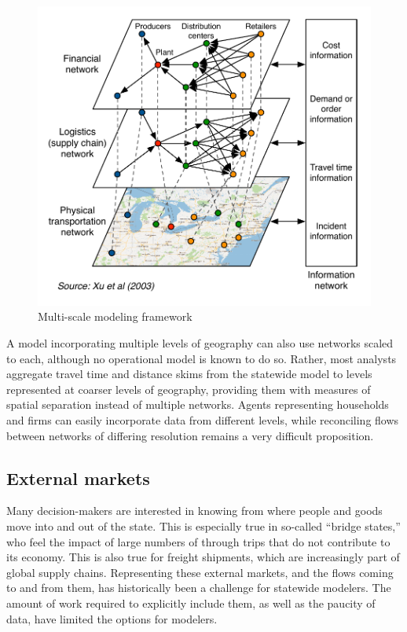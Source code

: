 \begin{figure}  %
\centering
\includegraphics[scale=0.6]{graphics/43-multi-scale-modeling}
\caption{Multi-scale modeling framework}
\label{fig:multi-scale-modeling}
\end{figure}

A model incorporating multiple levels of geography can also use networks scaled to each, although no operational model is known to do so. Rather, most analysts aggregate travel time and distance skims from the statewide model to levels represented at coarser levels of geography, providing them with measures of spatial separation instead of multiple networks. Agents representing households and firms can easily incorporate data from different levels, while reconciling flows between networks of differing resolution remains a very difficult proposition.

\subsection{External markets}

Many decision-makers are interested in knowing from where people and goods move into and out of the state. This is especially true in so-called ``bridge states,'' who feel the impact of large numbers of through trips that do not contribute to its economy. This is also true for freight shipments, which are increasingly part of global supply chains. Representing these external markets, and the flows coming to and from them, has historically been a challenge for statewide modelers. The amount of work required to explicitly include them, as well as the paucity of data, have limited the options for modelers.

